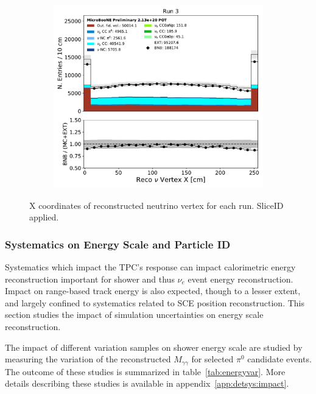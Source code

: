 \begin{figure}[hbt!]
\begin{center}
\begin{subfigure}[b]{0.3\textwidth}
    \caption{\label{fig:systematics:run2:nuvtxx}}
    \end{subfigure} %
    \begin{subfigure}[b]{0.3\textwidth}
    \centering
    \includegraphics[width=1.00\textwidth]{NuMuCCsel/Images/Ryan/Run3_nocrt/reco_nu_vtx_sce_x_08062020_samples_longest_noCRT_event_category.pdf}
    \caption{\label{fig:systematics:run3:nuvtxx}}
    \end{subfigure}
\caption{X coordinates of reconstructed neutrino vertex for each run. SliceID applied.}
\label{fig:systematics:numu:nuvtxx}
\end{center}
\end{figure}

\subsubsection{Systematics on Energy Scale and Particle ID} 
\label{sec:detsys:tpc}
Systematics which impact the TPC's response can impact calorimetric energy reconstruction important for shower and thus $\nu_e$ event energy reconstruction. Impact on range-based track energy is also expected, though to a lesser extent, and largely confined to systematics related to SCE position reconstruction. This section studies the impact of simulation uncertainties on energy scale reconstruction.
\par The impact of different variation samples on shower energy scale are studied by measuring the variation of the reconstructed $M_{\gamma\gamma}$ for selected $\pi^0$ candidate events. The outcome of these studies is summarized in table~\ref{tab:energyvar}. More details describing these studies is available in appendix~\ref{app:detsys:impact}.


